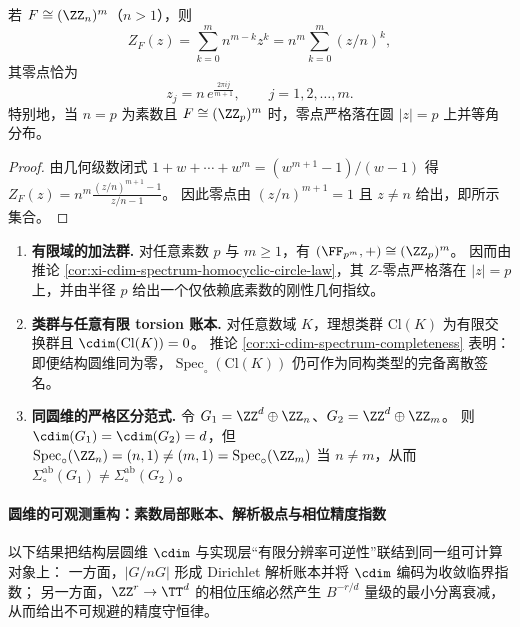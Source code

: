 \begin{corollary}\label{cor:xi-cdim-spectrum-homocyclic-circle-law}
若 \(F\cong (\ZZ_{n})^{m}\)（\(n>1\)），则
\[
Z_F(z)=\sum_{k=0}^{m} n^{m-k}z^{k}=n^{m}\sum_{k=0}^{m}(z/n)^{k},
\]
其零点恰为
\[
z_j=n\,e^{\frac{2\pi i j}{m+1}},\qquad j=1,2,\dots,m.
\]
特别地，当 \(n=p\) 为素数且 \(F\cong (\ZZ_{p})^{m}\) 时，零点严格落在圆 \(|z|=p\) 上并等角分布。
\end{corollary}
\begin{proof}
由几何级数闭式 \(1+w+\cdots+w^m=(w^{m+1}-1)/(w-1)\) 得
\(
Z_F(z)=n^{m}\frac{(z/n)^{m+1}-1}{z/n-1}
\)。
因此零点由 \((z/n)^{m+1}=1\) 且 \(z\ne n\) 给出，即所示集合。
\end{proof}

\begin{example}\label{ex:xi-cdim-same-cdim-different-spectrum}
\begin{enumerate}
  \item \textbf{有限域的加法群.}
        对任意素数 \(p\) 与 \(m\ge 1\)，有 \((\FF_{p^m},+)\cong (\ZZ_{p})^{m}\)。
        因而由推论 \ref{cor:xi-cdim-spectrum-homocyclic-circle-law}，其 \(Z\)-零点严格落在 \(|z|=p\) 上，并由半径 \(p\) 给出一个仅依赖底素数的刚性几何指纹。
  \item \textbf{类群与任意有限 torsion 账本.}
        对任意数域 \(K\)，理想类群 \(\mathrm{Cl}(K)\) 为有限交换群且 \(\cdim(\mathrm{Cl}(K))=0\)。
        推论 \ref{cor:xi-cdim-spectrum-completeness} 表明：即便结构圆维同为零，\(\operatorname{Spec}_{\circ}(\mathrm{Cl}(K))\) 仍可作为同构类型的完备离散签名。
  \item \textbf{同圆维的严格区分范式.}
        令 \(G_1=\ZZ^{d}\oplus \ZZ_{n}\)、\(G_2=\ZZ^{d}\oplus \ZZ_{m}\)。
        则 \(\cdim(G_1)=\cdim(G_2)=d\)，但
        \(
        \operatorname{Spec}_{\circ}(\ZZ_{n})=(n,1)\neq(m,1)=\operatorname{Spec}_{\circ}(\ZZ_{m})
        \)
        当 \(n\neq m\)，从而 \(\Sigma_{\circ}^{\mathrm{ab}}(G_1)\neq \Sigma_{\circ}^{\mathrm{ab}}(G_2)\)。
\end{enumerate}
\end{example}

\paragraph{圆维的可观测重构：素数局部账本、解析极点与相位精度指数}
以下结果把结构层圆维 \(\cdim\) 与实现层“有限分辨率可逆性”联结到同一组可计算对象上：
一方面，\(|G/nG|\) 形成 Dirichlet 解析账本并将 \(\cdim\) 编码为收敛临界指数；
另一方面，\(\ZZ^r\to\TT^d\) 的相位压缩必然产生 \(B^{-r/d}\) 量级的最小分离衰减，从而给出不可规避的精度守恒律。

